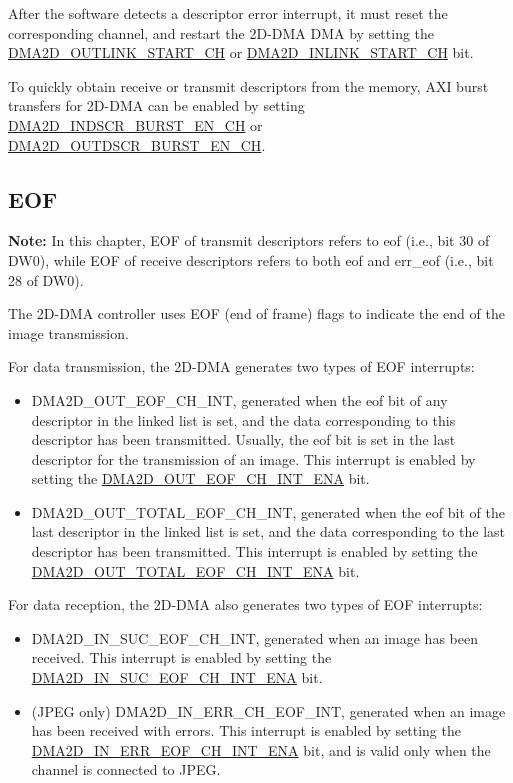 \documentclass[main\_\_EN.tex]{subfiles}
\begin{document}
After the software detects a descriptor error interrupt, it must reset the corresponding channel, and restart the 2D-DMA DMA by setting the \hyperref[fielddesc:DMA2DOUTLINKSTARTCHN]{DMA2D\_OUTLINK\_START\_CH} or \hyperref[fielddesc:DMA2DINLINKSTARTCHN]{DMA2D\_INLINK\_START\_CH} bit.

To quickly obtain receive or transmit descriptors from the memory, AXI burst transfers for 2D-DMA can be enabled by setting \hyperref[fielddesc:DMA2DINDSCRBURSTENCHN]{DMA2D\_INDSCR\_BURST\_EN\_CH} or \hyperref[fielddesc:DMA2DOUTDSCRBURSTENCHN]{DMA2D\_OUTDSCR\_BURST\_EN\_CH}.


\subsection{EOF}

{\bfseries Note: }In this chapter, EOF of transmit descriptors refers to eof (i.e., bit 30 of DW0), while EOF of receive descriptors refers to both eof and err\_eof (i.e., bit 28 of DW0).

The 2D-DMA controller uses EOF (end of frame) flags to indicate the end of the image transmission.

For data transmission, the 2D-DMA generates two types of EOF interrupts:
\begin{itemize}
    \item DMA2D\_OUT\_EOF\_CH\_INT, generated when the eof bit of any descriptor in the linked list is set, and the data corresponding to this descriptor has been transmitted. Usually, the eof bit is set in the last descriptor for the transmission of an image. This interrupt is enabled by setting the \hyperref[fielddesc:DMA2DOUTEOFCHNINTENA]{DMA2D\_OUT\_EOF\_CH\_INT\_ENA} bit.
    \item DMA2D\_OUT\_TOTAL\_EOF\_CH\_INT, generated when the eof bit of the last descriptor in the linked list is set, and the data corresponding to the last descriptor has been transmitted. This interrupt is enabled by setting the \hyperref[fielddesc:DMA2DOUTTOTALEOFCHNINTENA]{DMA2D\_OUT\_TOTAL\_EOF\_CH\_INT\_ENA} bit.
\end{itemize}

For data reception, the 2D-DMA also generates two types of EOF interrupts:
\begin{itemize}
    \item DMA2D\_IN\_SUC\_EOF\_CH\_INT, generated when an image has been received. This interrupt is enabled by setting the \hyperref[fielddesc:DMA2DINSUCEOFCHNINTENA]{DMA2D\_IN\_SUC\_EOF\_CH\_INT\_ENA} bit.
    \item (JPEG only) DMA2D\_IN\_ERR\_CH\_EOF\_INT, generated when an image has been received with errors. This interrupt is enabled by setting the \hyperref[fielddesc:DMA2DINERREOFCHNINTENA]{DMA2D\_IN\_ERR\_EOF\_CH\_INT\_ENA} bit, and is valid only when the channel is connected to JPEG.
\end{itemize}
\end{document}
